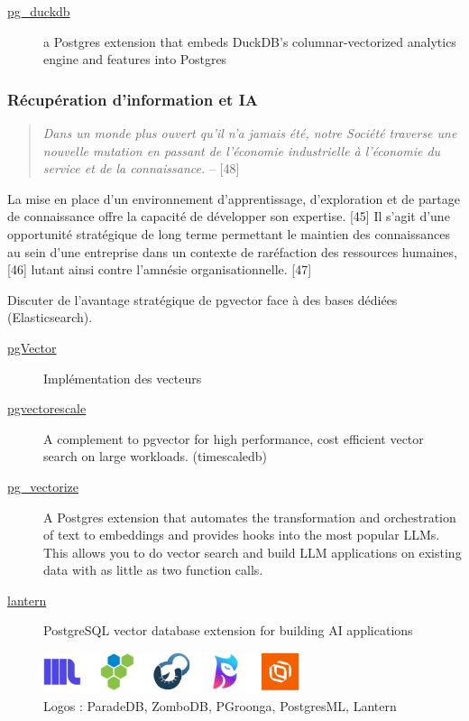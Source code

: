 \documentclass[a4paper,12pt]{article}
\begin{document}
\begin{multicols*}{2}
\begin{description}
\item[{\href{https://github.com/duckdb/pg\_duckdb}{pg\_duckdb}}] a Postgres extension that embeds DuckDB's columnar-vectorized analytics engine and features into Postgres
\end{description}
\subsubsection*{Récupération d'information et IA}
\label{sec:org3b4d9a7}
\begin{quote}
\emph{Dans un monde plus ouvert qu’il n’a jamais été, notre Société traverse une nouvelle mutation en passant de l’économie industrielle à l’économie du service et de la connaissance.} -- [48]
\end{quote}

La mise en place d’un environnement d’apprentissage, d’exploration et de partage de connaissance offre la capacité de développer son expertise. [45] Il s’agit d’une opportunité stratégique de long terme permettant le maintien des connaissances au sein d’une entreprise dans un contexte de raréfaction des ressources humaines, [46] lutant ainsi contre l’amnésie organisationnelle. [47] 

Discuter de l’avantage stratégique de pgvector face à des bases dédiées (Elasticsearch).

\begin{description}
\item[{\href{https://github.com/pgvector/pgvector}{pgVector}}] Implémentation des vecteurs
\item[{\href{https://github.com/timescale/pgvectorscale}{pgvectorescale}}] A complement to pgvector for high performance, cost efficient vector search on large workloads. (timescaledb)
\item[{\href{https://github.com/tembo-io/pg\_vectorize}{pg\_vectorize}}] A Postgres extension that automates the transformation and orchestration of text to embeddings and provides hooks into the most popular LLMs. This allows you to do vector search and build LLM applications on existing data with as little as two function calls.
\item[{\href{https://github.com/lanterndata/lantern}{lantern}}] PostgreSQL vector database extension for building AI applications
\end{description}

\begin{figure}[H]
\centering
\includegraphics[height=1.2cm]{icons/pg-search.pdf}
\caption{\label{fig:orgadbfc13}Logos : ParadeDB, ZomboDB, PGroonga, PostgresML, Lantern}
\end{figure}



\end{multicols*}
\end{document}
